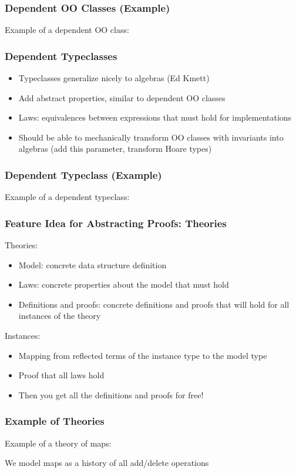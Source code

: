 \documentclass{beamer}
\begin{document}
\begin{frame}
  \frametitle{Dependent OO Classes (Example)}
  Example of a dependent OO class:
  \lstset{language=java, basicstyle=\ttfamily\scriptsize}
  
\end{frame}

\begin{frame}
  \frametitle{Dependent Typeclasses}
  \begin{itemize}
    \item Typeclasses generalize nicely to algebras (Ed Kmett)
    \item Add abstract properties, similar to dependent OO classes
    \item Laws: equivalences between expressions that must hold for
      implementations
    \item Should be able to mechanically transform OO classes with
      invariants into algebras (add this parameter, transform Hoare
      types)
  \end{itemize}
\end{frame}

\begin{frame}
  \frametitle{Dependent Typeclass (Example)}
  Example of a dependent typeclass:
  \lstset{language=haskell, basicstyle=\ttfamily\scriptsize}
  
\end{frame}

\begin{frame}
  \frametitle{Feature Idea for Abstracting Proofs: Theories}
  Theories:
  \begin{itemize}
    \item Model: concrete data structure definition
    \item Laws: concrete properties about the model that must hold
    \item Definitions and proofs: concrete definitions and proofs that
      will hold for all instances of the theory
  \end{itemize}
  Instances:
  \begin{itemize}
    \item Mapping from reflected terms of the instance type to the
      model type
    \item Proof that all laws hold
    \item Then you get all the definitions and proofs for free!
  \end{itemize}
\end{frame}

\begin{frame}
  \frametitle{Example of Theories}

  Example of a theory of maps:
  \lstset{language=haskell, basicstyle=\ttfamily\scriptsize}
  
  We model maps as a history of all add/delete operations
\end{frame}
\end{document}
